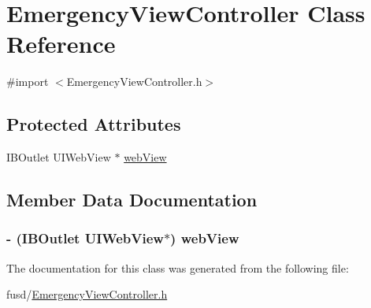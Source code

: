 \hypertarget{interface_emergency_view_controller}{
\section{\-Emergency\-View\-Controller \-Class \-Reference}
\label{interface_emergency_view_controller}
}


{\ttfamily \#import $<$\-Emergency\-View\-Controller.\-h$>$}

\subsection*{\-Protected \-Attributes}
\begin{DoxyCompactItemize}
\item 
\-I\-B\-Outlet \-U\-I\-Web\-View $\ast$ \hyperlink{interface_emergency_view_controller_aeb0c10466c34ec07385931d6a39a5be9}{web\-View}
\end{DoxyCompactItemize}


\subsection{\-Member \-Data \-Documentation}
\hypertarget{interface_emergency_view_controller_aeb0c10466c34ec07385931d6a39a5be9}{
\subsubsection[{web\-View}]{\setlength{\rightskip}{0pt plus 5cm}-\/ (\-I\-B\-Outlet \-U\-I\-Web\-View$\ast$) {\bf web\-View}}}
\label{interface_emergency_view_controller_aeb0c10466c34ec07385931d6a39a5be9}


\-The documentation for this class was generated from the following file\-:\begin{DoxyCompactItemize}
\item 
fusd/\hyperlink{_emergency_view_controller_8h}{\-Emergency\-View\-Controller.\-h}\end{DoxyCompactItemize}
